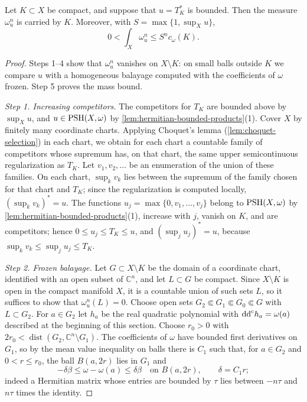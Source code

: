 \begin{proposition}\label{prop:hermitian-extremal-mass-support}
Let $K\subset X$ be compact, and suppose that $u=T_K^*$ is bounded. Then the measure $\omega_u^n$ is carried by $K$. Moreover, with $S=\max\{1,\sup_Xu\}$,
\begin{equation}\label{eq:hermitian-extremal-capacity-bound}
                    0<\int_X\omega_u^n\leq S^n c_\omega(K).
\end{equation}
\end{proposition}
\begin{proof}
Steps 1--4 show that $\omega_u^n$ vanishes on $X\setminus K$: on small balls outside $K$ we compare $u$ with a homogeneous balayage computed with the coefficients of $\omega$ frozen. Step 5 proves the mass bound.

\emph{Step 1. Increasing competitors.} The competitors for $T_K$ are bounded above by $\sup_Xu$, and $u\in\mathrm{PSH}(X,\omega)$ by \cref{lem:hermitian-bounded-products}(1). Cover $X$ by finitely many coordinate charts. Applying Choquet's lemma (\cref{lem:choquet-selection}) in each chart, we obtain for each chart a countable family of competitors whose supremum has, on that chart, the same upper semicontinuous regularization as $T_K$. Let $v_1,v_2,\ldots$ be an enumeration of the union of these families. On each chart, $\sup_kv_k$ lies between the supremum of the family chosen for that chart and $T_K$; since the regularization is computed locally, $(\sup_kv_k)^*=u$. The functions $u_j=\max\{0,v_1,\ldots,v_j\}$ belong to $\mathrm{PSH}(X,\omega)$ by \cref{lem:hermitian-bounded-products}(1), increase with $j$, vanish on $K$, and are competitors; hence $0\leq u_j\leq T_K\leq u$, and $(\sup_ju_j)^*=u$, because $\sup_kv_k\leq\sup_ju_j\leq T_K$.

\emph{Step 2. Frozen balayage.} Let $G\subset X\setminus K$ be the domain of a coordinate chart, identified with an open subset of $\mathbb C^n$, and let $L\subset G$ be compact. Since $X\setminus K$ is open in the compact manifold $X$, it is a countable union of such sets $L$, so it suffices to show that $\omega_u^n(L)=0$. Choose open sets $G_2\Subset G_1\Subset G_0\Subset G$ with $L\subset G_2$. For $a\in G_2$ let $h_a$ be the real quadratic polynomial with $\mathrm{dd}^{\mathrm{c}} h_a=\omega(a)$ described at the beginning of this section. Choose $r_0>0$ with $2r_0<\operatorname{dist}(G_2,\mathbb C^n\setminus G_1)$. The coefficients of $\omega$ have bounded first derivatives on $G_1$, so by the mean value inequality on balls there is $C_1$ such that, for $a\in G_2$ and $0<r\leq r_0$, the ball $B(a,2r)$ lies in $G_1$ and
\[
 -\delta\beta\leq\omega-\omega(a)\leq\delta\beta\quad\text{on }B(a,2r),\qquad\delta=C_1r;
\]
indeed a Hermitian matrix whose entries are bounded by $\tau$ lies between $-n\tau$ and $n\tau$ times the identity.


\end{proof}
